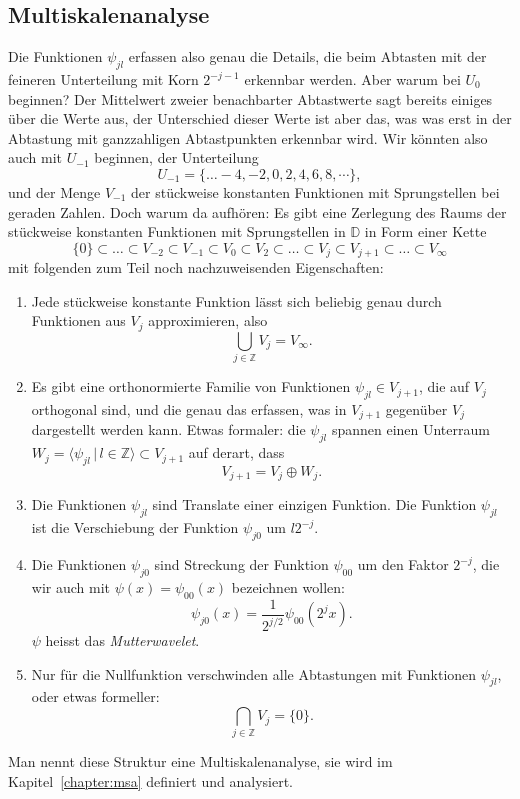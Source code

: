 \subsection{Multiskalenanalyse}
Die Funktionen $\psi_{jl}$ erfassen also genau die Details, die beim
Abtasten mit der feineren Unterteilung mit Korn $2^{-j-1}$ erkennbar
werden.
Aber warum bei $U_0$ beginnen?
Der Mittelwert zweier benachbarter Abtastwerte sagt bereits einiges
über die Werte aus, der Unterschied dieser Werte ist aber das, was
was erst in der Abtastung mit ganzzahligen Abtastpunkten erkennbar wird.
Wir könnten also auch mit $U_{-1}$ beginnen, der Unterteilung
\[
U_{-1} = \{\dots -4,-2,0,2,4,6,8,\cdots\},
\]
und der Menge $V_{-1}$ der stückweise konstanten Funktionen mit
Sprungstellen bei geraden Zahlen.
Doch warum da aufhören: Es gibt eine Zerlegung des Raums der stückweise
konstanten Funktionen mit Sprungstellen in $\mathbb D$ in Form einer
Kette
\begin{equation}
\{0\}
\subset
\dots
\subset
V_{-2}\subset V_{-1} \subset V_{0} \subset V_{2} \subset\dots\subset
V_j \subset V_{j+1}\subset\dots \subset V_{\infty}
\label{haar:kette}
\end{equation}
mit folgenden zum Teil noch nachzuweisenden Eigenschaften:
\begin{enumerate}
\item
Jede stückweise konstante Funktion lässt sich beliebig genau
durch Funktionen aus $V_j$ approximieren, also
\[
\bigcup_{j\in\mathbb Z} V_j = V_\infty.
\]
\item
Es gibt eine orthonormierte Familie von Funktionen $\psi_{jl}\in V_{j+1}$,
die auf $V_j$ orthogonal sind, und die genau das erfassen, was in $V_{j+1}$
gegenüber $V_j$ dargestellt werden kann.
Etwas formaler: die $\psi_{jl}$ spannen einen Unterraum
$W_{j} = \langle \psi_{jl}\,|\, l\in\mathbb Z\rangle \subset V_{j+1}$
auf derart, dass
\[
V_{j+1} = V_j \oplus W_j.
\]
\item 
Die Funktionen $\psi_{jl}$ sind Translate einer einzigen Funktion.
Die Funktion $\psi_{jl}$ ist die Verschiebung der Funktion $\psi_{j0}$ 
um $l2^{-j}$.
\item
Die Funktionen $\psi_{j0}$ sind Streckung der Funktion
$\psi_{00}$ um den Faktor $2^{-j}$, die wir auch mit
$\psi(x)=\psi_{00}(x)$ bezeichnen wollen:
\[
\psi_{j0}(x) = \frac1{2^{j/2}}\psi_{00}(2^jx).
\]
$\psi$ heisst das {\em Mutterwavelet}.
\item 
Nur für die Nullfunktion verschwinden alle Abtastungen mit Funktionen
$\psi_{jl}$, oder etwas formeller:
\[
\bigcap_{j\in\mathbb Z} V_j
=
\{0\}.
\]
\end{enumerate}
Man nennt diese Struktur eine Multiskalenanalyse, sie wird im
Kapitel~\ref{chapter:msa} definiert und analysiert.

